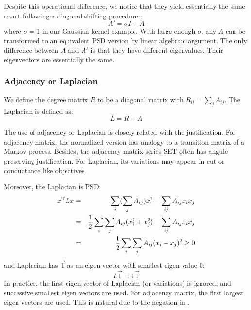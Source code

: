 Despite this operational difference, we notice that they yield 
essentially the same result following a diagonal shifting procedure
\cite{dhillon2004unified}:
\begin{equation}
	A' = \sigma I + A
\end{equation}
where $\sigma = 1$ in our Gaussian kernel example. 
With large enough $\sigma$, any $A$ can be transformed to 
an equivalent PSD version by linear algebraic argument. 
The only difference between $A$ and $A'$ is that they 
have different eigenvalues. Their eigenvectors are 
essentially the same. 

\subsubsection{Adjacency or Laplacian}

We define the degree matrix $R$ to be a diagonal matrix with 
$R_{ii} = \sum_j{A_{ij}}$. The Laplacian is defined as:
\begin{equation}
	L = R - A
	\label{eq:def_lap}
\end{equation}

The use of adjacency or Laplacian is closely related with 
the justification. For adjacency matrix, the normalized version 
has analogy to a transition matrix of a Markov process. 
Besides, the adjacency matrix series SET often has 
angule preserving justification. 
For Laplacian, its variations may appear in cut or conductance
like objectives. 

Moreover, the Laplacian is PSD:
\begin{eqnarray}
	x^\mathrm{T}Lx &=& \sum_i (\sum_j{A_{ij}})x_i^2
		- \sum_{ij}A_{ij}x_ix_j \nonumber \\
		&=& \frac{1}{2} \sum_i\sum_j{A_{ij}}(x_i^2+x_j^2) 
		- \sum_{ij}A_{ij}x_ix_j \nonumber \\
		&=& \frac{1}{2} \sum_i\sum_j{A_{ij}}(x_i-x_j)^2 \ge 0
		\label{eq:lap_psd}
\end{eqnarray}
and Laplacian has $\vec{1}$ as an eigen vector with smallest eigen 
value 0:
\begin{equation}
	L \vec{1} = 0 \vec{1}
\end{equation}
In practice, the first eigen vector of Laplacian (or variations) is 
ignored, and successive smallest eigen vectors are used. For adjacency 
matrix, the first largest eigen vectors are used. This is natural 
due to the negation in \req{\ref{eq:def_lap}}. 

